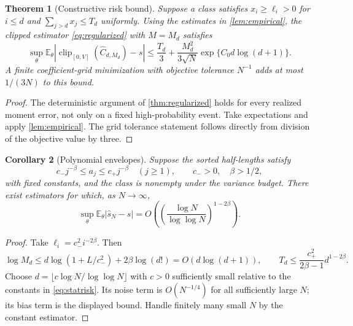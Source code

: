\documentclass[11pt,letterpaper]{article}
\numberwithin{equation}{section}
\newtheorem{theorem}{Theorem}[section]
\newtheorem{corollary}[theorem]{Corollary}
\theoremstyle{definition}
\theoremstyle{remark}
\newcommand{\E}{\mathbb E}
\newcommand{\clip}{\operatorname{clip}_{[0,V]}}
\begin{document}
\begin{theorem}[Constructive risk bound]
\label{thm:statbound}
Suppose a class satisfies $x_i\ge\ell_i>0$ for $i\le d$ and
$\sum_{j>d}x_j\le T_d$ uniformly. Using the estimates in
\cref{lem:empirical}, the clipped estimator \eqref{eq:regularized} with
$M=M_d$ satisfies
\begin{equation}
 \sup_\theta\E_\theta|\clip(\widehat C_{d,M_d})-s|
 \le\frac{T_d}{3}
 +\frac{M_d^2}{3\sqrt N}\exp\{C_0d\log(d+1)\}.
 \label{eq:statrisk}
\end{equation}
A finite coefficient-grid minimization with objective tolerance $N^{-1}$
adds at most $1/(3N)$ to this bound.
\end{theorem}
\begin{proof}
The deterministic argument of \cref{thm:regularized} holds for every realized
moment error, not only on a fixed high-probability event. Take expectations
and apply \cref{lem:empirical}. The grid tolerance statement follows directly
from division of the objective value by three.
\end{proof}

\begin{corollary}[Polynomial envelopes]
\label{cor:polyrate}
Suppose the sorted half-lengths satisfy
\begin{equation}
 c_-j^{-\beta}\le a_j\le c_+j^{-\beta}\quad(j\ge1),
 \qquad c_->0,\quad \beta>1/2,
 \label{eq:polyenvelope}
\end{equation}
with fixed constants, and the class is nonempty under the variance budget.
There exist estimators for which, as $N\to\infty$,
\begin{equation}
 \sup_\theta\E_\theta|\widehat s_N-s|
 =O\left(\left(\frac{\log N}{\log\log N}\right)^{1-2\beta}\right).
 \label{eq:polyrate}
\end{equation}
\end{corollary}
\begin{proof}
Take $\ell_i=c_-^2i^{-2\beta}$. Then
\[
 \log M_d\le d\log(1+L/c_-^2)+2\beta\log(d!)=O(d\log(d+1)),
 \qquad
 T_d\le\frac{c_+^2}{2\beta-1}d^{1-2\beta}.
\]
Choose $d=\lfloor c\log N/\log\log N\rfloor$ with $c>0$ sufficiently
small relative to the constants in \eqref{eq:statrisk}. Its noise term is
$O(N^{-1/4})$ for all sufficiently large $N$; its bias term is the displayed
bound. Handle finitely many small $N$ by the constant estimator.
\end{proof}
\end{document}
